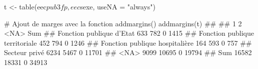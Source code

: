 \documentclass[12pt,twosided, notitlepage]{book}
\newenvironment{Shaded}{}{}
\newcommand{\KeywordTok}[1]{\textcolor[rgb]{0.00,0.00,1.00}{{#1}}}
\newcommand{\DataTypeTok}[1]{{#1}}
\newcommand{\StringTok}[1]{\textcolor[rgb]{0.00,0.50,0.50}{{#1}}}
\newcommand{\CommentTok}[1]{\textcolor[rgb]{0.00,0.50,0.00}{{#1}}}
\newcommand{\NormalTok}[1]{{#1}}
\renewenvironment{Shaded}{\begin{snugshade}}{\end{snugshade}}
\begin{document}
\begin{Shaded}
\begin{Highlighting}[]
\NormalTok{t <-}\StringTok{ }\KeywordTok{table}\NormalTok{(eec$pub3fp, eec$sexe, }\DataTypeTok{useNA =} \StringTok{"always"}\NormalTok{)}

\CommentTok{# Ajout de marges avec la fonction addmargins()}
\KeywordTok{addmargins}\NormalTok{(t)}
  \NormalTok{##                                 }
  \NormalTok{##                                      1     2  <NA>   Sum}
  \NormalTok{##   Fonction publique d'Etat         633   782     0  1415}
  \NormalTok{##   Fonction publique territoriale   452   794     0  1246}
  \NormalTok{##   Fonction publique hospitalière   164   593     0   757}
  \NormalTok{##   Secteur privé                   6234  5467     0 11701}
  \NormalTok{##   <NA>                            9099 10695     0 19794}
  \NormalTok{##   Sum                            16582 18331     0 34913}


\end{Highlighting}
\end{Shaded}
\end{document}
